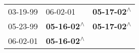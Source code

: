\begin{supertabular}{lll}
 03-19-99\textsuperscript{} &                   06-02-01\textsuperscript{} &  \textbf{05-17-02\textsuperscript{$\wedge$}} \\
 05-23-99\textsuperscript{} &  \textbf{05-16-02\textsuperscript{$\wedge$}} &  \textbf{05-17-02\textsuperscript{$\wedge$}} \\
 06-02-01\textsuperscript{} &  \textbf{05-16-02\textsuperscript{$\wedge$}} &                                              \\
\end{supertabular}
